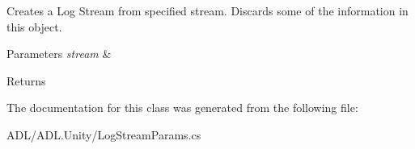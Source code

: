 Creates a Log Stream from specified stream. Discards some of the information in this object. 


\begin{DoxyParams}{Parameters}
{\em stream} & \\
\hline
\end{DoxyParams}
\begin{DoxyReturn}{Returns}

\end{DoxyReturn}


The documentation for this class was generated from the following file\+:\begin{DoxyCompactItemize}
\item 
A\+D\+L/\+A\+D\+L.\+Unity/Log\+Stream\+Params.\+cs\end{DoxyCompactItemize}
